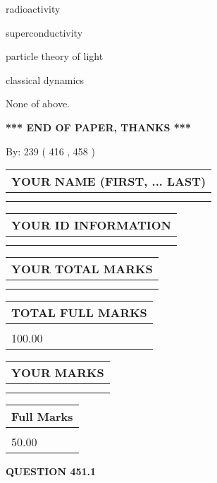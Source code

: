 \documentclass[12pt]{article}
\begin{document}
 
radioactivity
 
 
superconductivity
 
 
particle theory of light
 
 
classical dynamics
 
 
 None of above.
 
 
   
   
\vspace{1.0in} 
{\textbf{\large{ *** END OF PAPER, THANKS *** }}} 
   
   
\hspace{1.0in} By: 
 239 ( 416 ,  458 )
   
   
   
   
\newpage 
\setcounter{page}{ 
   451001 } 
   
   
   
   
\noindent\begin{tabular}{|l|}
\hline
YOUR NAME (FIRST, ... LAST)  \\
\hline
 \\ 
 \\ 
\hline
\end{tabular}
\hspace{0.05in} \begin{tabular}{|l|}
\hline
 YOUR   ID   INFORMATION  \\
\hline
 \\ 
 \\ 
\hline
\end{tabular}
   
   
\vspace{0.2in}\noindent\begin{tabular}{|l|}
\hline
YOUR TOTAL MARKS  \\
\hline
 \\ 
 \\ 
\hline
\end{tabular}
\hspace{0.05in} \begin{tabular}{|l|}
\hline
TOTAL FULL MARKS  \\
\hline
 \\ 
100.00 \\
\hline
\end{tabular}
  
\vspace{0.2in}
  
\noindent\begin{tabular}{|l|}
\hline
 YOUR MARKS  \\
\hline
 \\ 
 \\ 
\hline
\end{tabular}
\hspace{0.05in} \begin{tabular}{|l|}
\hline
 Full Marks  \\
\hline
 \\ 
50.00 \\
\hline
\end{tabular}
{\textbf{\Large{QUESTION
451.1 
}}}
  
\end{document}
